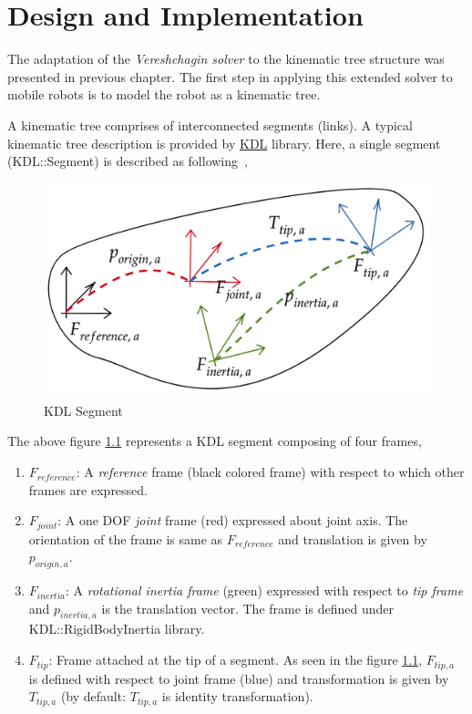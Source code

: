 
\chapter{Design and Implementation} 

The adaptation of the \textit{Vereshchagin solver} to the kinematic tree structure was presented in previous chapter. The first step in applying this extended solver to mobile robots is to model the robot as a kinematic tree. 

A kinematic tree comprises of interconnected segments (links). A typical kinematic tree description is provided by \hyperref[kdl]{KDL} library. Here, a single segment (KDL::Segment) is described as following~\cite{kinematictreeKDL},

\begin{figure}[h!]
	\begin{center}
		\includegraphics[scale=0.3]{images/segment}
	\end{center}
	\caption{KDL Segment}
	\label{fig:segment}
\end{figure} 

The above figure \ref{fig:segment} represents a KDL segment composing of four frames,
\begin{enumerate}
	\item $F_{reference}$: A \textit{reference} frame (black colored frame) with respect to which other frames are expressed.
	\item $F_{joint}$: A one DOF \textit{joint} frame (red) expressed about joint axis. The orientation of the frame is same as $F_{reference}$ and translation is given by $p_{origin, a}$.
	\item $F_{inertia}$: A \textit{rotational inertia frame} (green) expressed with respect to \textit{tip frame} and $p_{inertia, a}$ is the translation vector. The frame is defined under KDL::RigidBodyInertia library.
	\item $F_{tip}$: Frame attached at the tip of a segment. As seen in the figure \ref{fig:segment}, $F_{tip, a}$ is defined with respect to joint frame (blue) and transformation is given by $T_{tip, a}$ (by default: $T_{tip, a}$ is identity transformation). 
\end{enumerate}


